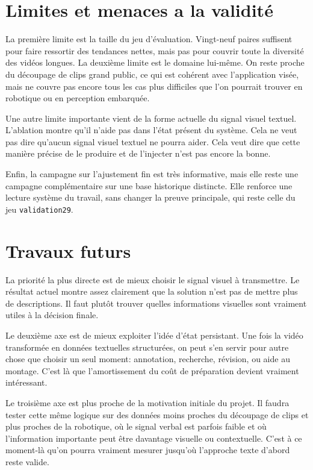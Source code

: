 \section{Limites et menaces a la validit\'e}

La premi\`ere limite est la taille du jeu d'\'evaluation. Vingt-neuf paires suffisent pour faire ressortir des tendances nettes, mais pas pour couvrir toute la diversit\'e des vid\'eos longues. La deuxi\`eme limite est le domaine lui-m\^eme. On reste proche du d\'ecoupage de clips grand public, ce qui est coh\'erent avec l'application vis\'ee, mais ne couvre pas encore tous les cas plus difficiles que l'on pourrait trouver en robotique ou en perception embarqu\'ee.

Une autre limite importante vient de la forme actuelle du signal visuel textuel. L'ablation montre qu'il n'aide pas dans l'\'etat pr\'esent du syst\`eme. Cela ne veut pas dire qu'aucun signal visuel textuel ne pourra aider. Cela veut dire que cette mani\`ere pr\'ecise de le produire et de l'injecter n'est pas encore la bonne.

Enfin, la campagne sur l'ajustement fin est tr\`es informative, mais elle reste une campagne compl\'ementaire sur une base historique distincte. Elle renforce une lecture syst\`eme du travail, sans changer la preuve principale, qui reste celle du jeu \texttt{validation29}.

\section{Travaux futurs}

La priorit\'e la plus directe est de mieux choisir le signal visuel \`a transmettre. Le r\'esultat actuel montre assez clairement que la solution n'est pas de mettre plus de descriptions. Il faut plut\^ot trouver quelles informations visuelles sont vraiment utiles \`a la d\'ecision finale.

Le deuxi\`eme axe est de mieux exploiter l'id\'ee d'\'etat persistant. Une fois la vid\'eo transform\'ee en donn\'ees textuelles structur\'ees, on peut s'en servir pour autre chose que choisir un seul moment: annotation, recherche, r\'evision, ou aide au montage. C'est l\`a que l'amortissement du co\^ut de pr\'eparation devient vraiment int\'eressant.

Le troisi\`eme axe est plus proche de la motivation initiale du projet. Il faudra tester cette m\^eme logique sur des donn\'ees moins proches du d\'ecoupage de clips et plus proches de la robotique, o\`u le signal verbal est parfois faible et o\`u l'information importante peut \^etre davantage visuelle ou contextuelle. C'est \`a ce moment-l\`a qu'on pourra vraiment mesurer jusqu'o\`u l'approche texte d'abord reste valide.
